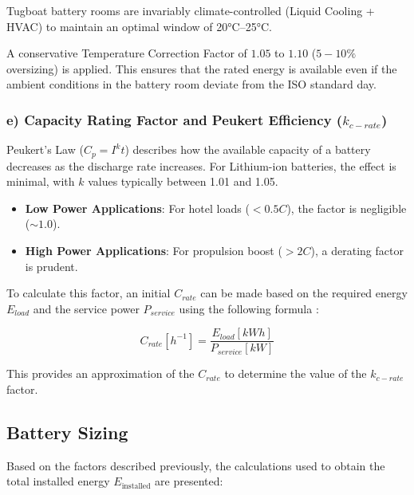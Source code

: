 Tugboat battery rooms are invariably climate-controlled (Liquid Cooling + HVAC) to maintain an optimal window of 20°C–25°C. 

A conservative Temperature Correction Factor of $1.05$ to $1.10$ ($5-10\%$ oversizing) is applied. This ensures that the rated energy is available even if the ambient conditions in the battery room deviate from the ISO standard day.

\subsubsection{e) Capacity Rating Factor and Peukert Efficiency ($k_{c-rate}$)}

Peukert's Law ($C_p = I^k t$) describes how the available capacity of a battery decreases as the discharge rate increases. For Lithium-ion batteries, the effect is minimal, with $k$ values typically between 1.01 and 1.05.

\begin{itemize}
	\item \textbf{Low Power Applications}: For hotel loads ($< 0.5C$), the factor is negligible ($\sim 1.0$).
	\item \textbf{High Power Applications}: For propulsion boost ($> 2C$), a derating factor is prudent.
\end{itemize}

To calculate this factor, an initial ${C}_{rate}$ can be made based on the required energy ${E}_{load}$ and the service power ${P}_{service}$ using the following formula \cite{MAN}:

\begin{equation}
{C}_{rate}[{h}^{-1}]=\frac{{E}_{load}[kWh]}{{P}_{service}[kW]}
\end{equation}

This provides an approximation of the ${C}_{rate}$ to determine the value of the $k_{c-rate}$ factor.
\subsection{Battery Sizing}

Based on the factors described previously, the calculations used to obtain the total installed energy ${E}_{\text{installed}}$ are presented:

